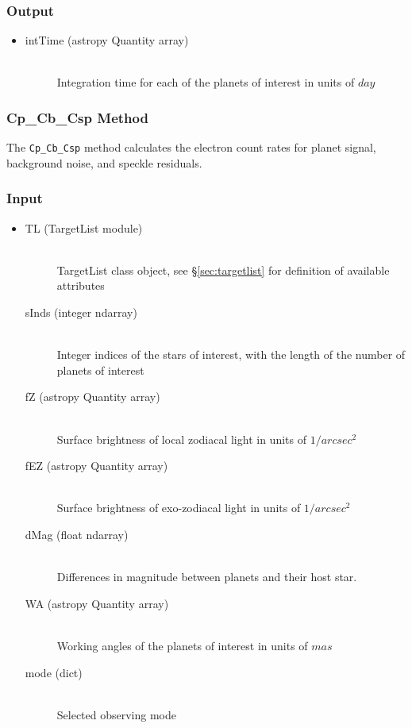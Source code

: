 \documentclass[cleanfoot]{asme2ej}
\begin{document}
\subsubsection*{Output}
\begin{itemize}
\item 
\begin{description}
    \item[intTime (astropy Quantity array)] \hfill \\ Integration time for each of the planets of interest in units of $ day $
\end{description}
\end{itemize}

\subsubsection{Cp\_Cb\_Csp Method} \label{sec:CpCbCsptask}
The \verb+Cp_Cb_Csp+ method calculates the electron count rates for planet signal, background noise, and speckle residuals.

\subsubsection*{Input}
\begin{itemize}
\item 
    \begin{description}
    \item[TL (TargetList module)] \hfill \\ TargetList class object, see \S\ref{sec:targetlist} for definition of available attributes
    \item[sInds (integer ndarray)] \hfill \\ Integer indices of the stars of interest, with the length of the number of planets of interest
    \item[fZ (astropy Quantity array)] \hfill \\ Surface brightness of local zodiacal light in units of $ 1/arcsec^2 $
    \item[fEZ (astropy Quantity array)] \hfill \\ Surface brightness of exo-zodiacal light in units of $ 1/arcsec^2 $
    \item[dMag (float ndarray)] \hfill \\ Differences in magnitude between planets and their host star.
    \item[WA (astropy Quantity array)] \hfill \\ Working angles of the planets of interest in units of $ mas $
    \item[mode (dict)] \hfill \\ Selected observing mode
\end{description}
\end{itemize}
\end{document}
